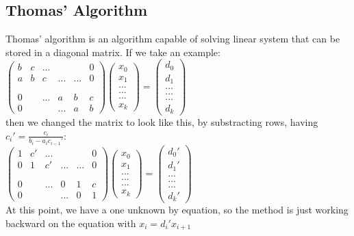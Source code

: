 \documentclass[12pt, a4paper]{report}
\begin{document}
\begin{appendix}
\chapter{Thomas' Algorithm}
Thomas' algorithm is an algorithm capable of solving linear system that can be stored in a diagonal matrix.
If we take an example: \\$\begin{pmatrix}
b & c & ... &&& 0\\
a & b & c & ...&... & 0\\
&&&&&\\
&&&&&\\
 0 & &...& a&b & c \\
0 &  &&...& a & b
\end{pmatrix}
\begin{pmatrix}
x_{0}\\
x_{1}\\
...\\
...\\
...\\
x_{k}
\end{pmatrix}
=
\begin{pmatrix}
d_{0}\\
d_{1}\\
...\\
...\\
...\\
d_{k}
\end{pmatrix}$\\
then we changed the matrix to look like this, by substracting rows, having $c_{i}' = \frac{c_{i}}{b_{i}-a_{i}c_{i-1}'}$: \\$\begin{pmatrix}
1 & c' & ... &&& 0\\
0 & 1 & c' & ...&... & 0\\
&&&&&\\
&&&&&\\
 0 & &...& 0&1 & c \\
0 &  &&...& 0 & 1
\end{pmatrix}
\begin{pmatrix}
x_{0}\\
x_{1}\\
...\\
...\\
...\\
x_{k}
\end{pmatrix}
=
\begin{pmatrix}
d_{0}'\\
d_{1}'\\
...\\
...\\
...\\
d_{k}'
\end{pmatrix}$\\
At this point, we have a one unknown by equation, so the method is just working backward on the equation with $x_{i} = d_{i}'x_{i+1}$\\

\end{appendix}
\end{document}
